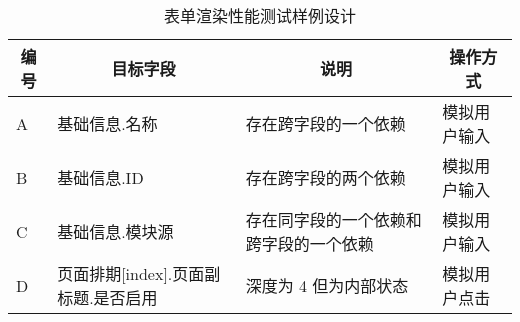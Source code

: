 \begin{table}[h]
    \centering
    \scriptsize
    \begin{tabular}{|l|l|l|l|}
        \hline
        \multicolumn{1}{|c|}{编号} & \multicolumn{1}{c|}{目标字段}       & \multicolumn{1}{c|}{说明}              & \multicolumn{1}{c|}{操作方式} \\ \hline
        A                          & 基础信息.名称                       & 存在跨字段的一个依赖                             & 模拟用户输入                  \\ \hline
        B                          & 基础信息.ID                         & 存在跨字段的两个依赖                   & 模拟用户输入                  \\ \hline
        C                          & 基础信息.模块源                     & 存在同字段的一个依赖和跨字段的一个依赖 & 模拟用户输入                  \\ \hline
        D                          & 页面排期[index].页面副标题.是否启用 & 深度为 4 但为内部状态        & 模拟用户点击                  \\ \hline
    \end{tabular}
    \normalsize
    \caption{表单渲染性能测试样例设计}
    \label{kaola-render-performence-testcases}
\end{table}